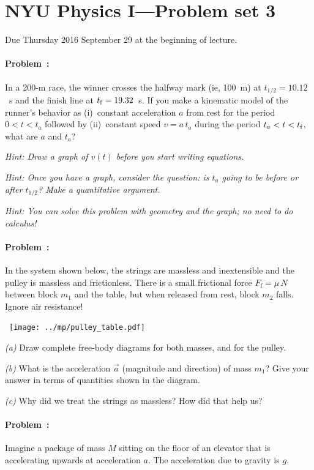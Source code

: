 \documentclass[12pt]{article}
\begin{document}
\thispagestyle{empty}

\section*{NYU Physics I---Problem set 3}

Due Thursday 2016 September 29 at the beginning of lecture.

\paragraph{Problem~\theproblem:}%
In a 200-m race, the winner crosses the halfway mark (ie, 100~m) at
$t_{1/2}=10.12$~s and the finish line at $t_{\rm f}=19.32$~s.  If you
make a kinematic model of the runner's behavior as (i)~constant
acceleration $a$ from rest for the period $0<t<t_a$ followed by
(ii)~constant speed $v=a\,t_a$ during the period $t_a<t<t_{\rm f}$,
what are $a$ and $t_a$?

\emph{Hint: Draw a graph of $v(t)$ before you start writing equations.}

\emph{Hint: Once you have a graph, consider the question: is $t_a$
going to be before or after $t_{1/2}$?  Make a quantitative argument.}

\emph{Hint: You can solve this problem with geometry and the graph; no
  need to do calculus!}

\paragraph{Problem~\theproblem:}%

In the system shown below, the strings are massless and inextensible
and the pulley is massless and frictionless.  There is a small
frictional force $F_\mathrm{f}=\mu\,N$ between block $m_1$ and the
table, but when released from rest, block $m_2$ falls. Ignore air
resistance!

\noindent~\hfill\texttt{[image: ../mp/pulley\_table.pdf]}\hfill~

\textsl{(a)} Draw complete free-body diagrams for both masses, and for
the pulley.

\textsl{(b)} What is the acceleration $\vec{a}$ (magnitude and
direction) of mass $m_1$?  Give your answer in terms of quantities
shown in the diagram.

\textsl{(c)} Why did we treat the strings as massless? How did that
help us?

\paragraph{Problem~\theproblem:}%
Imagine a package of mass $M$ sitting on the floor of an elevator that
is accelerating upwards at acceleration $a$. The acceleration due to
gravity is $g$.
\end{document}
